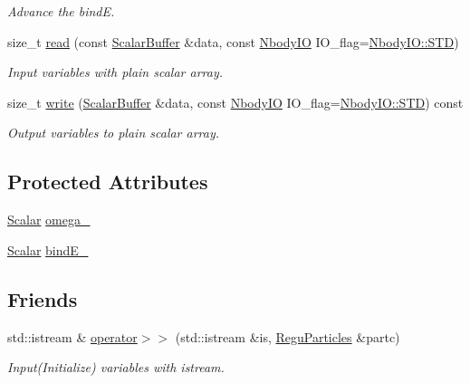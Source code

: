 \begin{DoxyCompactItemize}
\begin{DoxyCompactList}\small\item\em Advance the bindE. \end{DoxyCompactList}\item 
size\+\_\+t \mbox{\hyperlink{class_space_h_1_1_regu_particles_a639789e55a57427963b49a95c4e66c86}{read}} (const \mbox{\hyperlink{class_space_h_1_1_vel_indep_particles_abca40159a816385790d5a6fd19c1dc6d}{Scalar\+Buffer}} \&data, const \mbox{\hyperlink{namespace_space_h_a296a8bae763a754564bfdce216e31b59}{Nbody\+IO}} I\+O\+\_\+flag=\mbox{\hyperlink{namespace_space_h_a296a8bae763a754564bfdce216e31b59ac6ce23be5d350ce18a665427d2d950f7}{Nbody\+I\+O\+::\+S\+TD}})
\begin{DoxyCompactList}\small\item\em Input variables with plain scalar array. \end{DoxyCompactList}\item 
size\+\_\+t \mbox{\hyperlink{class_space_h_1_1_regu_particles_a5e6f99ab289e48790db7599fac59aa5a}{write}} (\mbox{\hyperlink{class_space_h_1_1_vel_indep_particles_abca40159a816385790d5a6fd19c1dc6d}{Scalar\+Buffer}} \&data, const \mbox{\hyperlink{namespace_space_h_a296a8bae763a754564bfdce216e31b59}{Nbody\+IO}} I\+O\+\_\+flag=\mbox{\hyperlink{namespace_space_h_a296a8bae763a754564bfdce216e31b59ac6ce23be5d350ce18a665427d2d950f7}{Nbody\+I\+O\+::\+S\+TD}}) const
\begin{DoxyCompactList}\small\item\em Output variables to plain scalar array. \end{DoxyCompactList}\end{DoxyCompactItemize}
\subsection*{Protected Attributes}
\begin{DoxyCompactItemize}
\item 
\mbox{\hyperlink{class_space_h_1_1_vel_indep_particles_aeb47d8131b30ed790320ff634f0d6af1}{Scalar}} \mbox{\hyperlink{class_space_h_1_1_regu_particles_a7e9eaabdd5e20d9ea16a56c22929273a}{omega\+\_\+}}
\item 
\mbox{\hyperlink{class_space_h_1_1_vel_indep_particles_aeb47d8131b30ed790320ff634f0d6af1}{Scalar}} \mbox{\hyperlink{class_space_h_1_1_regu_particles_af708a170d51c845813d8f8ef01a3ac79}{bind\+E\+\_\+}}
\end{DoxyCompactItemize}
\subsection*{Friends}
\begin{DoxyCompactItemize}
\item 
std\+::istream \& \mbox{\hyperlink{class_space_h_1_1_regu_particles_a9a189bff31e696428cec5810b545f050}{operator$>$$>$}} (std\+::istream \&is, \mbox{\hyperlink{class_space_h_1_1_regu_particles}{Regu\+Particles}} \&partc)
\begin{DoxyCompactList}\small\item\em Input(\+Initialize) variables with istream. \end{DoxyCompactList}\end{DoxyCompactItemize}
